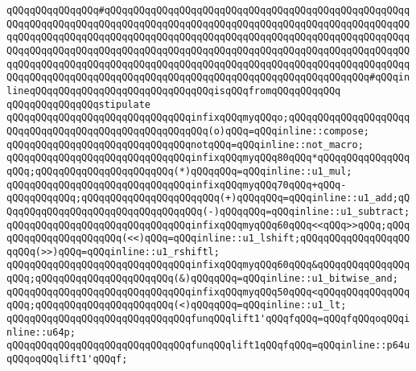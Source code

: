\verb|qQQqqQQqqQQqqQQq#qQQqqQQqqQQqqQQqqQQqqQQqqQQqqQQqqQQqqQQqqQQqqQQqqQQqqQQqqQQqqQQqqQQqqQQqqQQqqQQqqQQqqQQqqQQqqQQqqQQqqQQqqQQqqQQqqQQqqQQqqQQqqQQqqQQqqQQqqQQqqQQqqQQqqQQqqQQqqQQqqQQqqQQqqQQqqQQqqQQqqQQqqQQqqQQqqQQqqQQqqQQqqQQqqQQqqQQqqQQqqQQqqQQqqQQqqQQqqQQqqQQqqQQqqQQqqQQqqQQqqQQqqQQqqQQqqQQqqQQqqQQqqQQqqQQqqQQqqQQqqQQqqQQqqQQqqQQqqQQqqQQqqQQqqQQqqQQqqQQqqQQqqQQqqQQqqQQqqQQqqQQqqQQqqQQqqQQqqQQqqQQqqQQqqQQqqQQq#qQQqinlineqQQqqQQqqQQqqQQqqQQqqQQqqQQqqQQqisqQQqfromqQQqqQQqqQQq|\newline
\verb|qQQqqQQqqQQqqQQqstipulate|\newline
\newline
\verb|qQQqqQQqqQQqqQQqqQQqqQQqqQQqqQQqinfixqQQqmyqQQqo;qQQqqQQqqQQqqQQqqQQqqQQqqQQqqQQqqQQqqQQqqQQqqQQqqQQqqQQq(o)qQQq=qQQqinline::compose;|\newline
\newline
\verb|qQQqqQQqqQQqqQQqqQQqqQQqqQQqqQQqnotqQQq=qQQqinline::not_macro;|\newline
\newline
\verb|qQQqqQQqqQQqqQQqqQQqqQQqqQQqqQQqinfixqQQqmyqQQq80qQQq*qQQqqQQqqQQqqQQqqQQq;qQQqqQQqqQQqqQQqqQQqqQQq(*)qQQqqQQq=qQQqinline::u1_mul;|\newline
\verb|qQQqqQQqqQQqqQQqqQQqqQQqqQQqqQQqinfixqQQqmyqQQq70qQQq+qQQq-qQQqqQQqqQQq;qQQqqQQqqQQqqQQqqQQqqQQq(+)qQQqqQQq=qQQqinline::u1_add;qQQqqQQqqQQqqQQqqQQqqQQqqQQqqQQqqQQq(-)qQQqqQQq=qQQqinline::u1_subtract;|\newline
\verb|qQQqqQQqqQQqqQQqqQQqqQQqqQQqqQQqinfixqQQqmyqQQq60qQQq<<qQQq>>qQQq;qQQqqQQqqQQqqQQqqQQqqQQq(<<)qQQq=qQQqinline::u1_lshift;qQQqqQQqqQQqqQQqqQQqqQQq(>>)qQQq=qQQqinline::u1_rshiftl;|\newline
\verb|qQQqqQQqqQQqqQQqqQQqqQQqqQQqqQQqinfixqQQqmyqQQq60qQQq&qQQqqQQqqQQqqQQqqQQq;qQQqqQQqqQQqqQQqqQQqqQQq(&)qQQqqQQq=qQQqinline::u1_bitwise_and;|\newline
\verb|qQQqqQQqqQQqqQQqqQQqqQQqqQQqqQQqinfixqQQqmyqQQq50qQQq<qQQqqQQqqQQqqQQqqQQq;qQQqqQQqqQQqqQQqqQQqqQQq(<)qQQqqQQq=qQQqinline::u1_lt;|\newline
\newline
\verb|qQQqqQQqqQQqqQQqqQQqqQQqqQQqqQQqfunqQQqlift1'qQQqfqQQq=qQQqfqQQqoqQQqinline::u64p;|\newline
\verb|qQQqqQQqqQQqqQQqqQQqqQQqqQQqqQQqfunqQQqlift1qQQqfqQQq=qQQqinline::p64uqQQqoqQQqlift1'qQQqf;|\newline
